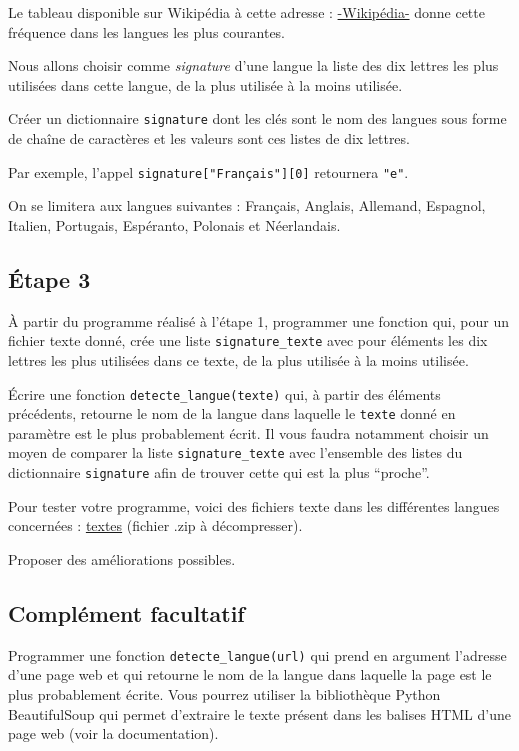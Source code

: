 \documentclass[
  a4paper,
  DIV=11,
  numbers=noendperiod]{scrartcl}
\begin{document}
Le tableau disponible sur Wikipédia à cette adresse :
\href{https://fr.wikipedia.org/wiki/Fr\%C3\%A9quence_d\%27apparition_des_lettres\#Dans_d\textquotesingle{}autres_langues}{-Wikipédia-}
donne cette fréquence dans les langues les plus courantes.

Nous allons choisir comme \emph{signature} d'une langue la liste des dix
lettres les plus utilisées dans cette langue, de la plus utilisée à la
moins utilisée.

Créer un dictionnaire \texttt{signature} dont les clés sont le nom des
langues sous forme de chaîne de caractères et les valeurs sont ces
listes de dix lettres.

Par exemple, l'appel \texttt{signature{[}"Français"{]}{[}0{]}}
retournera \texttt{"e"}.

On se limitera aux langues suivantes : Français, Anglais, Allemand,
Espagnol, Italien, Portugais, Espéranto, Polonais et Néerlandais.

\hypertarget{uxe9tape-3}{%
\subsection{Étape 3}\label{uxe9tape-3}}

À partir du programme réalisé à l'étape 1, programmer une fonction qui,
pour un fichier texte donné, crée une liste \texttt{signature\_texte}
avec pour éléments les dix lettres les plus utilisées dans ce texte, de
la plus utilisée à la moins utilisée.

Écrire une fonction \texttt{detecte\_langue(texte)} qui, à partir des
éléments précédents, retourne le nom de la langue dans laquelle le
\texttt{texte} donné en paramètre est le plus probablement écrit. Il
vous faudra notamment choisir un moyen de comparer la liste
\texttt{signature\_texte} avec l'ensemble des listes du dictionnaire
\texttt{signature} afin de trouver cette qui est la plus ``proche''.

Pour tester votre programme, voici des fichiers texte dans les
différentes langues concernées : \href{textes.zip}{textes} (fichier .zip
à décompresser).

Proposer des améliorations possibles.

\hypertarget{compluxe9ment-facultatif}{%
\subsection{Complément facultatif}\label{compluxe9ment-facultatif}}

Programmer une fonction \texttt{detecte\_langue(url)} qui prend en
argument l'adresse d'une page web et qui retourne le nom de la langue
dans laquelle la page est le plus probablement écrite. Vous pourrez
utiliser la bibliothèque Python BeautifulSoup qui permet d'extraire le
texte présent dans les balises HTML d'une page web (voir la
documentation).
\end{document}

